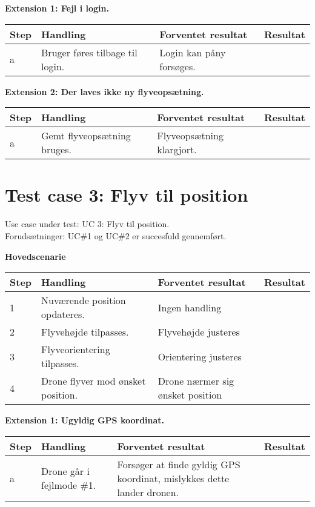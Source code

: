 \textbf{Extension 1: Fejl i login.}
\begin{table}[H]
	\centering
		\begin{tabular}{|l|p{5 cm}|p{5 cm}|p{3.5 cm}|} 
		\hline
			Step & Handling & Forventet resultat & Resultat\\ \hline
			a & Bruger føres tilbage til login. & Login kan påny forsøges. & \\ \hline
		\end{tabular}
\end{table}

\textbf{Extension 2: Der laves ikke ny flyveopsætning.}
\begin{table}[H]
	\centering
		\begin{tabular}{|l|p{5 cm}|p{5 cm}|p{3.5 cm}|} 
		\hline
			Step & Handling & Forventet resultat & Resultat\\ \hline
			a & Gemt flyveopsætning bruges. & Flyveopsætning klargjort. & \\ \hline
		\end{tabular}
\end{table}

\newpage

\section{Test case 3: Flyv til position}
Use case under test: UC 3: Flyv til position.\\
Forudsætninger:	UC\#1 og UC\#2 er succesfuld gennemført.

\textbf{Hovedscenarie}
\begin{table}[H]
	\centering
		\begin{tabular}{|l|p{5 cm}|p{5 cm}|p{3.5 cm}|} 
		\hline
			Step & Handling & Forventet resultat & Resultat\\ \hline
			1 & Nuværende position opdateres. & Ingen handling  &  \\ \hline
			2 & Flyvehøjde tilpasses. & Flyvehøjde justeres &  \\ \hline
			3 & Flyveorientering tilpasses. & Orientering justeres &  \\ \hline
			4 & Drone flyver mod ønsket position. & Drone nærmer sig ønsket position  &  \\ \hline
		\end{tabular}
\end{table}

\textbf{Extension 1: Ugyldig GPS koordinat.}
\begin{table}[H]
	\centering
		\begin{tabular}{|l|p{5 cm}|p{5 cm}|p{3.5 cm}|} 
		\hline
			Step & Handling & Forventet resultat & Resultat\\ \hline
			a & Drone går i fejlmode \#1. & Forsøger at finde gyldig GPS koordinat, mislykkes dette lander dronen. & \\ \hline
		\end{tabular}
\end{table}


